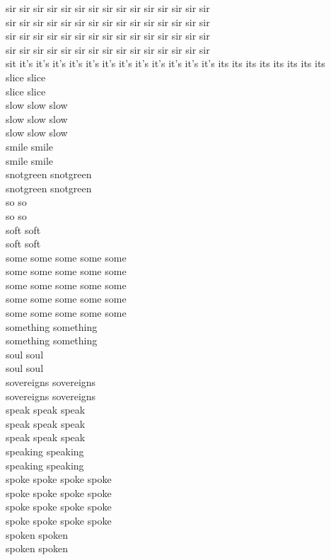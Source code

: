 sir sir sir sir sir sir sir sir sir sir sir sir sir sir sir\\
sir sir sir sir sir sir sir sir sir sir sir sir sir sir sir\\
sir sir sir sir sir sir sir sir sir sir sir sir sir sir sir\\
sir sir sir sir sir sir sir sir sir sir sir sir sir sir sir\\
sit it's it's it's it's it's it's it's it's it's it's it's it's its its its its its its its its\\
slice slice\\
slice slice\\
slow slow slow\\
slow slow slow\\
slow slow slow\\
smile smile\\
smile smile\\
snotgreen snotgreen\\
snotgreen snotgreen\\
so so\\
so so\\
soft soft\\
soft soft\\
some some some some some\\
some some some some some\\
some some some some some\\
some some some some some\\
some some some some some\\
something something\\
something something\\
soul soul\\
soul soul\\
sovereigns sovereigns\\
sovereigns sovereigns\\
speak speak speak\\
speak speak speak\\
speak speak speak\\
speaking speaking\\
speaking speaking\\
spoke spoke spoke spoke\\
spoke spoke spoke spoke\\
spoke spoke spoke spoke\\
spoke spoke spoke spoke\\
spoken spoken\\
spoken spoken\\
